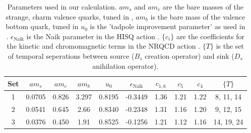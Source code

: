 \begin{table}
\begin{center}
 \begin{tabular}{||c c c c c c c c c c||}
 \hline
 Set & $am_s$ & $am_c$ & $am_b$ & $u_0$ & $\epsilon_{\text{Naik}}$ & $c_{1,6}$ & $c_5$ & $c_4$ & $\{T\}$ \\ [0.5ex] 
 \hline\hline
 1 & 0.0705 & 0.826 & 3.297 & 0.8195 & -0.3449 & 1.36 & 1.21 & 1.22 & 8, 11, 14 \\ [1ex]
 2 & 0.0541 & 0.645 & 2.66 & 0.8340 & -0.2348 & 1.31 & 1.16 & 1.20 & 9, 12, 15 \\ [1ex]
 3 & 0.0376 & 0.450 & 1.91 & 0.8525 & -0.1256 & 1.21 & 1.12 & 1.16 & 14, 19, 24 \\ [1ex]
 \hline
\end{tabular}
\caption{Parameters used in our calculation. $am_s$ and $am_c$ are the bare masses of the strange, charm valence quarks, tuned in \cite{PhysRevD.91.054508}, $am_b$ is the bare mass of the valence bottom quark, tuned in \cite{Dowdall:2011wh}
$u_0$ is the 'tadpole improvement parameter' as used in \cite{Dowdall:2011wh}.
$\epsilon_{\text{Naik}}$ is the Naik parameter in the HISQ action \cite{Follana:2006rc}.
$\{c_i\}$ are the coefficients for the kinetic and chromomagnetic terms in the NRQCD action \cite{Hammant:2013sca}. $\{T\}$
is the set of temporal seperations between source ($B_s$ creation operator) and sink ($D_s$ anihilation operator). \label{table:quarkmasses}
}
\end{center}
\end{table}

